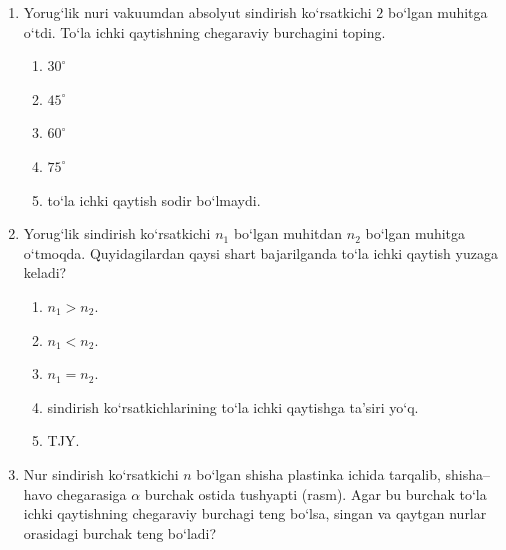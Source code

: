 \begin{enumerate}
\item Yorug‘lik nuri vakuumdan absolyut sindirish ko‘rsatkichi $2$ bo‘lgan muhitga o‘tdi. To‘la ichki qaytishning chegaraviy burchagini toping.
\begin{enumerate}[label=\Alph*)]
\item $30^\circ$
\item $45^\circ$
\item $60^\circ$
\item $75^\circ$
\item to‘la ichki qaytish sodir bo‘lmaydi.
\end{enumerate}

\item Yorug‘lik sindirish ko‘rsatkichi $n_1$ bo‘lgan muhitdan $n_2$ bo‘lgan muhitga o‘tmoqda. Quyidagilardan qaysi shart bajarilganda to‘la ichki qaytish yuzaga keladi?
\begin{enumerate}[label=\Alph*)]
\item $n_1>n_2$.
\item $n_1<n_2$.
\item $n_1=n_2$.
\item sindirish ko‘rsatkichlarining to‘la ichki qaytishga ta’siri yo‘q.
\item TJY.
\end{enumerate}

\item Nur sindirish ko‘rsatkichi $n$ bo‘lgan shisha plastinka ichida tarqalib, shisha–havo chegarasiga $\alpha$ burchak ostida tushyapti (rasm). Agar bu burchak to‘la ichki qaytishning chegaraviy burchagi teng bo‘lsa, singan va qaytgan nurlar orasidagi burchak teng bo‘ladi?



\end{enumerate}
